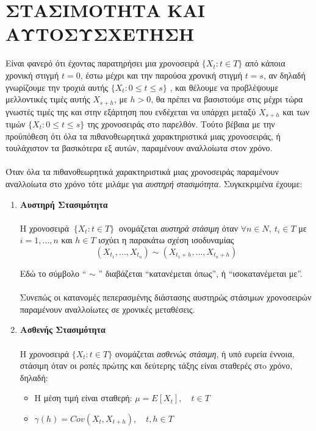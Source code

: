 \section{ ΣΤΑΣΙΜΟΤΗΤΑ ΚΑΙ ΑΥΤΟΣΥΣΧΕΤΗΣΗ}

Είναι φανερό ότι έχοντας παρατηρήσει μια χρονοσειρά
$ \{ X_t : t \in T \} $
από κάποια
χρονική στιγμή $ t = 0 $, έστω μέχρι και την παρούσα χρονική στιγμή $ t = s $, αν δηλαδή
γνωρίζουμε την τροχιά αυτής $ \{ X_t : 0 \leq t \leq s \}$ , και θέλουμε να προβλέψουμε
μελλοντικές τιμές αυτής $ X_{s + h} $, με $ h > 0 $, θα πρέπει να βασιστούμε στις μέχρι τώρα
γνωστές τιμές της και στην εξάρτηση που ενδέχεται να υπάρχει μεταξύ $ X_{s + h} $ και
των τιμών
$ \{ X_t : 0 \leq t \leq s \}$
της χρονοσειράς στο παρελθόν. Τούτο βέβαια με την
προϋπόθεση ότι όλα τα πιθανοθεωρητικά χαρακτηριστικά μιας χρονοσειράς, ή
τουλάχιστον τα βασικότερα εξ αυτών, παραμένουν αναλλοίωτα στον χρόνο. \\ \\
Όταν όλα τα πιθανοθεωρητικά χαρακτηριστικά μιας χρονοσειράς παραμένουν
αναλλοίωτα στο χρόνο τότε μιλάμε για \textit{αυστηρή στασιμότητα}. Συγκεκριμένα έχουμε:
\begin{enumerate}
\item \textbf{ Αυστηρή Στασιμότητα} \\\\
Η χρονοσειρά $\: \{ X_t: t \in T \} \: $ ονομάζεται
\textit{αυστηρά στάσιμη} όταν $ \forall n \in N,\:  t_i \in T $ με $ i=1,\ldots ,n $  και  $ h \in T $
ισχύει η παρακάτω
σχέση ισοδυναμίας \\
$$ \left( X_{t_1}, \ldots , X_{t_n} \right)  \sim \left( X_{t_1+h}, \ldots , X_{t_n+h}    \right) $$


Εδώ το σύμβολο “ $\sim$ ” διαβάζεται “κατανέμεται όπως”, ή “ισοκατανέμεται με”. \\\\
Συνεπώς οι κατανομές πεπερασμένης διάστασης αυστηρώς στάσιμων
χρονοσειρών παραμένουν αναλλοίωτες σε χρονικές μεταθέσεις. 

\item \textbf{ Ασθενής Στασιμότητα} \\\\
Η χρονοσειρά
$ \{ X_t : t \in T \}$
ονομάζεται
\textit{ασθενώς στάσιμη}, ή υπό ευρεία έννοια, στάσιμη όταν οι ροπές πρώτης και δεύτερης τάξης είναι σταθερές στo
χρόνο, δηλαδή: \\
\begin{itemize}
\item Η μέση τιμή είναι σταθερή: $  \mu = E \left[ X_t \right] ,\quad t \in T $
\item $ \gamma(h)=Cov(X_t,X_{t+h}), \quad t,h \in T $
\end{itemize} 
\end{enumerate}

